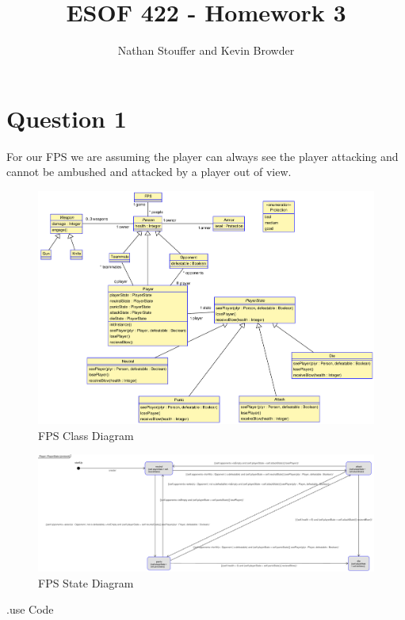 \documentclass{article}
\begin{document}
	
\title{ESOF 422 - Homework 3}
\author{Nathan Stouffer and Kevin Browder}

\maketitle
\newpage

\section*{Question 1}
	For our FPS we are assuming the player can always see the player attacking and cannot be ambushed and attacked by a player out of view.  
	\begin{figure}[h]
		\includegraphics[width=\linewidth]{fps-class-diag.pdf}
		\caption{FPS Class Diagram}
		\label{fig:q1class}
	\end{figure}
	
	\begin{figure}[h]
		\includegraphics[width=\linewidth]{fps-state-diag.pdf}
		\caption{FPS State Diagram}
		\label{fig:q1class}
	\end{figure}
	\newpage
	
	.use Code
	
\end{document}
